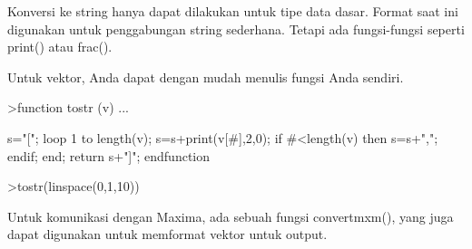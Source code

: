 \documentclass[a4paper,10pt]{article}
\begin{document}
\begin{eulernotebook}
\begin{eulercomment}
\begin{eulercomment}
\begin{eulercomment}
\begin{eulercomment}
\begin{eulercomment}
\begin{eulercomment}
\begin{eulercomment}
\begin{eulercomment}
\begin{eulercomment}
\begin{eulercomment}
\begin{eulercomment}
\begin{eulercomment}
\begin{eulercomment}
\begin{eulercomment}
\begin{eulercomment}
\begin{eulercomment}
\begin{eulercomment}
\begin{eulercomment}
\begin{eulercomment}
\begin{eulercomment}
\begin{eulercomment}
\begin{eulercomment}
\begin{eulercomment}
\begin{eulercomment}
\begin{eulercomment}
\begin{eulercomment}
\begin{eulercomment}
\begin{eulercomment}
\begin{eulercomment}
\begin{eulercomment}
\begin{eulercomment}
\begin{eulercomment}
\begin{eulercomment}
\begin{eulercomment}
\begin{eulercomment}
\begin{eulercomment}
\begin{eulercomment}
\begin{eulercomment}
\begin{eulercomment}
\begin{eulercomment}
\begin{eulercomment}
\begin{eulercomment}
\begin{eulercomment}
\begin{eulercomment}
\begin{eulercomment}
\begin{eulercomment}
\begin{eulercomment}
\begin{eulercomment}
\begin{eulercomment}
Konversi ke string hanya dapat dilakukan untuk tipe data dasar. Format
saat ini digunakan untuk penggabungan string sederhana. Tetapi ada
fungsi-fungsi seperti print() atau frac().

Untuk vektor, Anda dapat dengan mudah menulis fungsi Anda sendiri.
\end{eulercomment}
\begin{eulerprompt}
>function tostr (v) ...
\end{eulerprompt}
\begin{eulerudf}
  s="[";
  loop 1 to length(v);
     s=s+print(v[#],2,0);
     if #<length(v) then s=s+","; endif;
  end;
  return s+"]";
  endfunction
\end{eulerudf}
\begin{eulerprompt}
>tostr(linspace(0,1,10))
\end{eulerprompt}
\begin{euleroutput}
  [0.00,0.10,0.20,0.30,0.40,0.50,0.60,0.70,0.80,0.90,1.00]
\end{euleroutput}
\begin{eulercomment}
Untuk komunikasi dengan Maxima, ada sebuah fungsi convertmxm(), yang
juga dapat digunakan untuk memformat vektor untuk output.
\end{eulercomment}

\end{eulercomment}
\end{eulercomment}
\end{eulercomment}
\end{eulercomment}
\end{eulercomment}
\end{eulercomment}
\end{eulercomment}
\end{eulercomment}
\end{eulercomment}
\end{eulercomment}
\end{eulercomment}
\end{eulercomment}
\end{eulercomment}
\end{eulercomment}
\end{eulercomment}
\end{eulercomment}
\end{eulercomment}
\end{eulercomment}
\end{eulercomment}
\end{eulercomment}
\end{eulercomment}
\end{eulercomment}
\end{eulercomment}
\end{eulercomment}
\end{eulercomment}
\end{eulercomment}
\end{eulercomment}
\end{eulercomment}
\end{eulercomment}
\end{eulercomment}
\end{eulercomment}
\end{eulercomment}
\end{eulercomment}
\end{eulercomment}
\end{eulercomment}
\end{eulercomment}
\end{eulercomment}
\end{eulercomment}
\end{eulercomment}
\end{eulercomment}
\end{eulercomment}
\end{eulercomment}
\end{eulercomment}
\end{eulercomment}
\end{eulercomment}
\end{eulercomment}
\end{eulercomment}
\end{eulercomment}
\end{eulernotebook}
\end{document}

